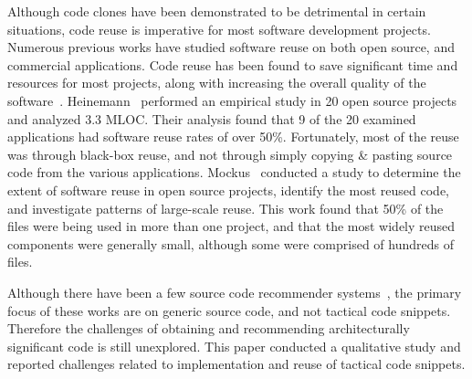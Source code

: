 Although code clones have been demonstrated to be detrimental in certain situations, code reuse is imperative for most software development projects. Numerous previous works have studied software reuse on both open source, and commercial applications. Code reuse has been found to save significant time and resources for most projects, along with increasing the overall quality of the software~\cite{493415}. Heinemann~\cite{Heinemann:2011:ENS:2022115.2022138} performed an empirical study in 20 open source projects and analyzed 3.3 MLOC. Their analysis found that 9 of the 20 examined applications had software reuse rates of over 50\%. Fortunately, most of the reuse was through black-box reuse, and not through simply copying \& pasting source code from the various applications. Mockus~\cite{mockus2007large} conducted a study to determine the extent of software reuse in open source projects, identify the most reused code, and investigate patterns of large-scale reuse. This work found that 50\% of the files were being used in more than one project, and that the most widely reused components were generally small, although some were comprised of hundreds of files.

Although there have been a few source code recommender systems~\cite{DBLP:conf/icse/McMillanHPCM12,6340250}, the primary focus of these works are on generic source code, and not tactical code snippets. Therefore the challenges of obtaining and recommending architecturally significant code is still unexplored. This paper conducted a qualitative study and reported challenges related to implementation and reuse of tactical code snippets.


 



% 







